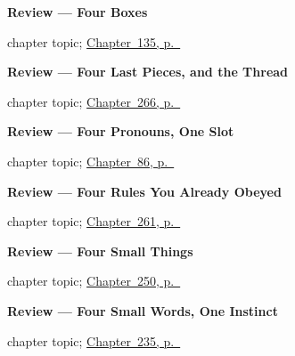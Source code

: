 \noindent\begin{minipage}[t]{\linewidth}
\raggedright
\textbf{Review --- Four Boxes}\par
\footnotesize chapter topic; \hyperref[ch:review-commands]{Chapter~135, p.~\pageref*{ch:review-commands}}
\end{minipage}\par\smallskip

\noindent\begin{minipage}[t]{\linewidth}
\raggedright
\textbf{Review --- Four Last Pieces, and the Thread}\par
\footnotesize chapter topic; \hyperref[ch:repaso-a1]{Chapter~266, p.~\pageref*{ch:repaso-a1}}
\end{minipage}\par\smallskip

\noindent\begin{minipage}[t]{\linewidth}
\raggedright
\textbf{Review --- Four Pronouns, One Slot}\par
\footnotesize chapter topic; \hyperref[ch:review-direct-object]{Chapter~86, p.~\pageref*{ch:review-direct-object}}
\end{minipage}\par\smallskip

\noindent\begin{minipage}[t]{\linewidth}
\raggedright
\textbf{Review --- Four Rules You Already Obeyed}\par
\footnotesize chapter topic; \hyperref[ch:repaso-implicito]{Chapter~261, p.~\pageref*{ch:repaso-implicito}}
\end{minipage}\par\smallskip

\noindent\begin{minipage}[t]{\linewidth}
\raggedright
\textbf{Review --- Four Small Things}\par
\footnotesize chapter topic; \hyperref[ch:repaso-tonicos]{Chapter~250, p.~\pageref*{ch:repaso-tonicos}}
\end{minipage}\par\smallskip

\noindent\begin{minipage}[t]{\linewidth}
\raggedright
\textbf{Review --- Four Small Words, One Instinct}\par
\footnotesize chapter topic; \hyperref[ch:repaso-juntores]{Chapter~235, p.~\pageref*{ch:repaso-juntores}}
\end{minipage}\par\smallskip

